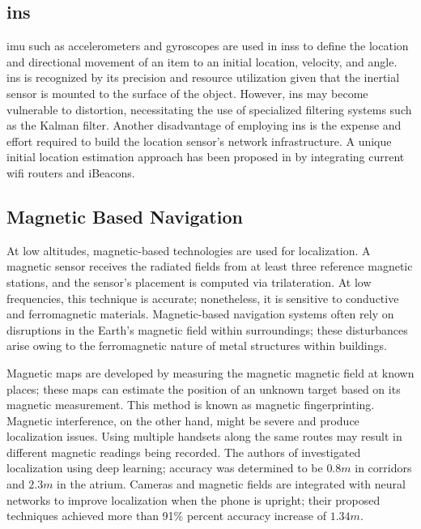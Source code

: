 \subsection{\acf{ins}}
\ac{imu} such as accelerometers and gyroscopes are used in \ac{ins}s to define the location and directional movement of an item to an initial location, velocity, and angle.
\ac{ins} is recognized by its precision and resource utilization given that the inertial sensor is mounted to the surface of the object.
However, \ac{ins} may become vulnerable to distortion, necessitating the use of specialized filtering systems such as the Kalman filter\cite{hu2020improving}.
Another disadvantage of employing \ac{ins} is the expense and effort required to build the location sensor's network infrastructure.
A unique initial location estimation approach has been proposed in \cite{chen2016smartphone} by integrating current \ac{wifi} routers and iBeacons.

\subsection{Magnetic Based Navigation}
At low altitudes, magnetic-based technologies are used for localization.
A magnetic sensor receives the radiated fields from at least three reference magnetic stations, and the sensor's placement is computed via trilateration.
At low frequencies, this technique is accurate;
nonetheless, it is sensitive to conductive and ferromagnetic materials.
Magnetic-based navigation systems often rely on disruptions in the Earth's magnetic field within surroundings;
these disturbances arise owing to the ferromagnetic nature of metal structures within buildings\cite{shu2015magicol}.

Magnetic maps are developed by measuring the magnetic magnetic field at known places;
these maps can estimate the position of an unknown target based on its magnetic measurement.
This method is known as magnetic fingerprinting.
Magnetic interference, on the other hand, might be severe and produce localization issues.
Using multiple handsets along the same routes may result in different magnetic readings being recorded.
The authors of \cite{lee2018amid} investigated localization using deep learning;
accuracy was determined to be $0.8 m$ in corridors and $2.3 m$ in the atrium.
Cameras and magnetic fields are integrated with neural networks to improve localization when the phone is upright;
their proposed techniques \cite{liu2016fusion} achieved more than 91\% percent accuracy increase of $1.34 m$.

